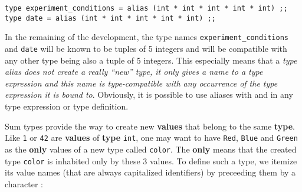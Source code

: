 {\scriptsize
\begin{lstlisting}
type experiment_conditions = alias (int * int * int * int * int) ;;
type date = alias (int * int * int * int * int) ;;
\end{lstlisting}}

\vspace{0.2cm}
\begin{syn}
 \is {}   
\end{syn}
\vspace{0.2cm}

In the remaining of the development, the type names
{\tt  experiment\_conditions} and {\tt date} will be known to be
tuples of 5 integers and will be compatible with any other type being
also a tuple of 5 integers. This especially means that a {\em type alias
does not create a really ``new'' type, it only gives a name to a type
expression and this name is type-compatible with any occurrence of the
type expression it is bound to}. Obviously, it is possible to use
aliases with and in any type expression or type definition.








\vspace{0.5cm}

Sum types provide the way to create new {\bf values} that
 belong to the same {\bf type}. Like {\tt 1} or {\tt 42} are
{\bf values} of {\bf type} {\tt int}, one may want to have {\tt Red},
{\tt Blue} and {\tt Green} as the {\bf only} values of a new type
called  {\tt color}. The {\bf only}  means that the created type {\tt color}
is inhabited only by these 3 values. To define
such a type, we itemize its value names (that are always capitalized
identifiers) by  preceeding them by a \terminal{\vertical} character :

